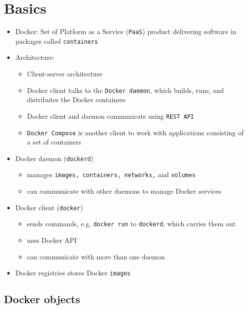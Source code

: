 \documentclass[11pt]{scrartcl}
\begin{document}
\tableofcontents

\newpage
\section{Basics} \label{basics}
\begin{itemize}
	\item Docker: Set of Platform as a Service (\texttt{PaaS}) product delivering software in packages called \texttt{containers}
	\item Architecture:
	\begin{itemize}
		\item Client-server architecture
		\item Docker client talks to the \texttt{Docker daemon}, which builds, runs, and distributes the Docker containers
		\item Docker client and daemon communicate using \texttt{REST API}
		\item \texttt{Docker Compose} is another client to work with applications consisting of a set of containers
	\end{itemize}
	\item Docker daemon (\texttt{dockerd}) 
	\begin{itemize}
		\item manages \texttt{images, containers, networks,} and \texttt{volumes}
		\item can communicate with other daemons to manage Docker services
	\end{itemize}
	\item Docker client (\texttt{docker}) 
	\begin{itemize}
		\item sends commands, e.g. \texttt{docker run} to \texttt{dockerd}, which carries them out
		\item uses Docker API
		\item can communicate with more than one daemon
	\end{itemize}
	\item Docker registries stores Docker \texttt{images}
\end{itemize}

\subsection{Docker objects} \label{docker_objects}
\end{document}
